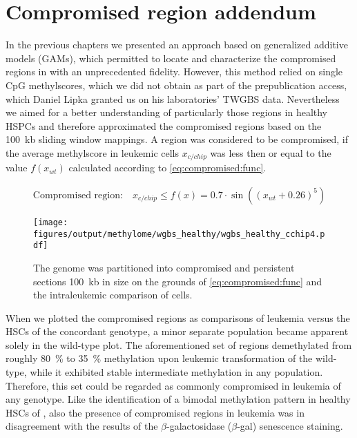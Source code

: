 \section{Compromised region addendum}
\label{chap:r:wgbs_chip_hsc:compromised}

In the previous chapters we presented an approach based on generalized additive models (GAMs), which permitted to locate and characterize the compromised regions in \dnmtchip with an unprecedented fidelity. However, this method relied on single CpG methylscores, which we did not obtain as part of the prepublication access, which Daniel Lipka granted us on his laboratories' TWGBS data. Nevertheless we aimed for a better understanding of particularly those regions in healthy HSPCs and therefore approximated the compromised regions based on the \SI{100}{\kilo b} sliding window mappings. A region was considered to be compromised, if the average methylscore in \dnmtchip \kitpos \mllafnine leukemic cells $x_{c/chip}$ was less then or equal to the value $f(x_{wt})$ calculated according to \autoref{eq:compromised:func}. 

\begin{eqnarray}
\label{eq:compromised:func} 
\text{Compromised region:} \hspace{1em} x_{c/chip} \leq f(x) = 0.7 \cdot \sin ((x_{wt} + 0.26)^5)
\end{eqnarray}


\begin{figure}[!ht] 
	\centering
	\texttt{[image: figures/output/methylome/wgbs\_healthy/wgbs\_healthy\_cchip4.pdf]} 
	\caption{The genome was partitioned into compromised and persistent sections \SI{100}{\kilo b} in size on the grounds of \autoref{eq:compromised:func} and the intraleukemic comparison of \mllafnine \kitpos cells.}
	\label{fig:wgbs_healthy_cchip4}
\end{figure}

When we plotted the compromised regions as comparisons of leukemia versus the HSCs of the concordant genotype, a minor separate population became apparent solely in the wild-type plot. The aforementioned set  of regions demethylated from roughly \SI{80}{\percent} to \SI{35}{\percent} methylation upon leukemic transformation of the wild-type, while it exhibited stable intermediate methylation in any \dnmtchip population. Therefore, this set could be regarded as commonly compromised in leukemia of any genotype. Like the identification of a bimodal methylation pattern in healthy HSCs of \dnmtchip, also the presence of compromised regions in \dnmtwt leukemia was in disagreement with the results of the \ensuremath{\beta}-galactosidase (\ensuremath{\beta}-gal) senescence staining. 

